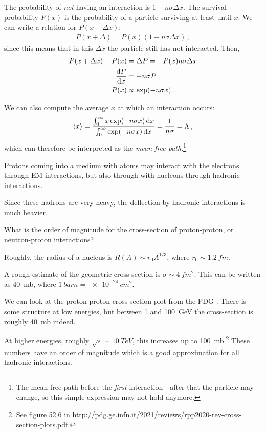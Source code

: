 \documentclass[main.tex]{subfiles}
\begin{document}
The probability of \emph{not} having an interaction is \(1 - n \sigma \Delta x\). 
The survival probability \(P(x)\) is the probability of a particle surviving at least until \(x\). 
We can write a relation for \(P(x + \Delta x)\): 
%
\begin{align}
P(x + \Delta ) = P(x) (1 - n \sigma \Delta x)
\,,
\end{align}
%
since this means that in this \(\Delta x\) the particle still has not interacted. 
Then, 
%
\begin{align}
P(x + \Delta x) - P(x) &= \Delta P = - P(x) n \sigma \Delta x  \\
\dv{P}{x} &= - n \sigma P \\
P(x) &\propto \exp(- n \sigma x)
\,.
\end{align}

We can also compute the average \(x\) at which an interaction occurs: 
%
\begin{align}
\expval{x} = \frac{\int_{0}^{\infty } x \exp(- n \sigma x) \dd{x}}{\int_0^{\infty} \exp(- n \sigma x) \dd{x}} = \frac{1}{n \sigma } = \Lambda 
\,,
\end{align}
%
which can therefore be interpreted as the \emph{mean free path}.\footnote{The mean free path before the \emph{first} interaction - after that the particle may change, so this simple expression may not hold anymore.}

Protons coming into a medium with atoms may interact with the electrons through EM interactions, but also through with nucleons through hadronic interactions. 

Since these hadrons are very heavy, the deflection by hadronic interactions is much heavier. 

What is the order of magnitude for the cross-section of proton-proton, or neutron-proton interactions? 

Roughly, the radius of a nucleus is \(R(A) \sim r_0 A^{1/3}\), where \(r_0 \sim \SI{1.2}{fm}\).

A rough estimate of the geometric cross-section is \(\sigma \sim \SI{4}{fm^2}\). 
This can be written as \SI{40}{mb}, where \(\SI{1}{barn} = \SI{e-24}{cm^2}\). 

We can look at the proton-proton cross-section plot from the PDG \cite[]{groupReviewParticlePhysics2020}. 
There is some structure at low energies, but between 1 and \SI{100}{GeV} the cross-section is roughly \SI{40}{mb} indeed. 

At higher energies, roughly \(\sqrt{s} \sim \SI{10}{TeV}\), this increases up to \SI{100}{mb}.\footnote{See figure 52.6 in \url{http://pdg.ge.infn.it/2021/reviews/rpp2020-rev-cross-section-plots.pdf}.}
These numbers have an order of magnitude which is a good approximation for all hadronic interactions. 
\end{document}
